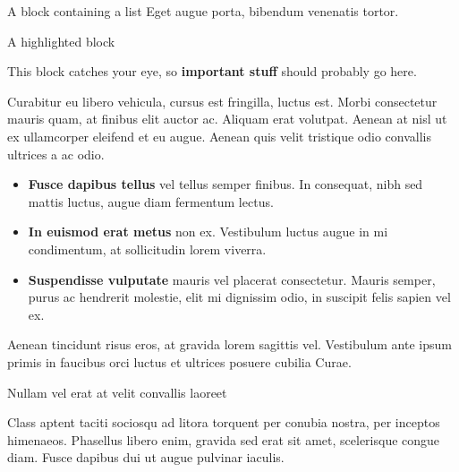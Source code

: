 \documentclass[final]{beamer}
\newlength{\colwidth}
\begin{document}
\begin{frame}[t]
\begin{columns}[t]
\begin{column}{\colwidth}
\begin{block}{A block containing a list}
                    Eget augue porta, bibendum venenatis tortor.

                \end{block}

                \begin{alertblock}{A highlighted block}

                    This block catches your eye, so \textbf{important stuff} should probably go
                    here.

                    Curabitur eu libero vehicula, cursus est fringilla, luctus est. Morbi
                    consectetur mauris quam, at finibus elit auctor ac. Aliquam erat volutpat.
                    Aenean at nisl ut ex ullamcorper eleifend et eu augue. Aenean quis velit
                    tristique odio convallis ultrices a ac odio.

                    \begin{itemize}
                        \item \textbf{Fusce dapibus tellus} vel tellus semper finibus. In
                        consequat, nibh sed mattis luctus, augue diam fermentum lectus.
                        \item \textbf{In euismod erat metus} non ex. Vestibulum luctus augue in
                        mi condimentum, at sollicitudin lorem viverra.
                        \item \textbf{Suspendisse vulputate} mauris vel placerat consectetur.
                        Mauris semper, purus ac hendrerit molestie, elit mi dignissim odio, in
                        suscipit felis sapien vel ex.
                    \end{itemize}

                    Aenean tincidunt risus eros, at gravida lorem sagittis vel. Vestibulum ante
                    ipsum primis in faucibus orci luctus et ultrices posuere cubilia Curae.

                \end{alertblock}

                \begin{block}{Nullam vel erat at velit convallis laoreet}

                    Class aptent taciti sociosqu ad litora torquent per conubia nostra, per
                    inceptos himenaeos. Phasellus libero enim, gravida sed erat sit amet,
                    scelerisque congue diam. Fusce dapibus dui ut augue pulvinar iaculis.


\end{block}
\end{column}
\end{columns}
\end{frame}
\end{document}
